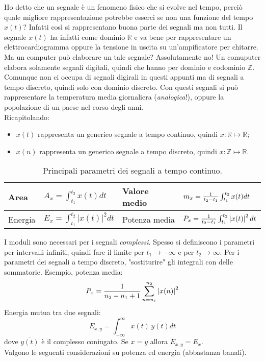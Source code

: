 \documentclass[a4paper,portrait,12pt]{article}
\theoremstyle{definition}
\begin{document}
Ho detto che un segnale è un fenomeno fisico che si evolve nel tempo, perciò quale migliore rappresentazione
potrebbe esserci se non una funzione del tempo $x(t)$? Infatti così si rappresentano buona parte dei segnali
ma non tutti. Il segnale $x(t)$ ha infatti come dominio $\mathbb{R}$ e va bene per rappresentare un 
elettrocardiogramma oppure la tensione in uscita su un'ampificatore per chitarre. Ma un computer può 
elaborare un tale segnale? Assolutamente no! Un comuputer elabora solamente segnali digitali, quindi che 
hanno per dominio e codominio $\mathbb{Z}$.\\
Comunque non ci occupa di segnali digirali in questi appunti ma di segnali a tempo discreto, quindi solo
con dominio discreto. Con questi segnali si può rappresentare la temperatura media giornaliera 
(\textit{analogica}!), oppure la popolazione di un paese nel corso degli anni.\\
Ricapitolando:
\begin{itemize}
\item $x(t)$ rappresenta un generico segnale a tempo continuo, quindi $x : \mathbb{R} \mapsto \mathbb{R}$;
\item $x(n)$ rappresenta un generico segnale a tempo discreto, quindi $x : \mathbb{Z} \mapsto \mathbb{R}$.
\end{itemize}
\bigskip

\begin{table}[h]
\begin{center}
\begin{tabular}{|l|l||l|l|}
\hline
Area & $A_x = \int_{t_1}^{t_2}x(t)dt$ & Valore medio & $m_x = {1 \over t_2 - t_1}\int_{t_1}^{t_2}x(t)dt$\\
\hline
Energia & $E_x = \int_{t_1}^{t_2}\left|x(t)\right|^2dt$ & Potenza media & $P_x = {1 \over t_2 - 
t_1}\int_{t_1}^{t_2}\left|x(t)\right|^2dt$\\
\hline
\end{tabular}
\caption{Principali parametri dei segnali a tempo continuo.}
\end{center}
\end{table}

I moduli sono necessari per i segnali \textit{complessi}. Spesso si definiscono i parametri per intervalli 
infiniti, quindi fare il limite per $t_1 \to -\infty$ e per $t_2 \to \infty$. Per i parametri dei segnali 
a tempo discreto, "sostiturire" gli integrali con delle sommatorie. Esempio, potenza media:
\begin{equation}
P_x = {1 \over n_2 - n_1 + 1}\sum_{n = n_1}^{n_2}\left|x(n)\right|^2
\end{equation}
Energia mutua tra due segnali:
\begin{equation}
E_{x,y} = \int_{-\infty}^{\infty}x(t)\,\overline{y(t)}dt
\end{equation}
dove $\overline{y(t)}$ è il complesso coniugato. Se $x = y$ allora $E_{x,y} = E_x$.\\
Valgono le seguenti considerazioni su potenza ed energia (abbastanza banali).
\end{document}
